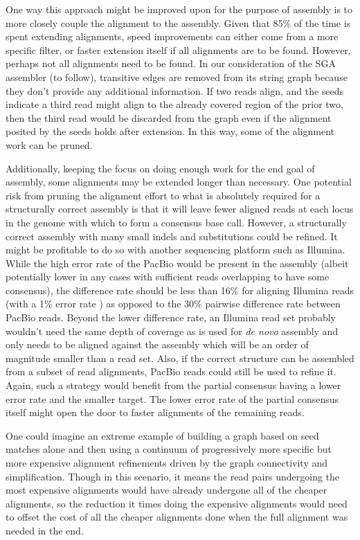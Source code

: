 One way this approach might be improved upon for the purpose of assembly is to more closely couple the alignment to the assembly.  Given that 85\% of the time is spent extending alignments, speed improvements can either come from a more specific filter, or faster extension itself if all alignments are to be found.  However, perhaps not all alignments need to be found.  In our consideration of the SGA assembler (to follow), transitive edges are removed from its string graph because they don't provide any additional information.  If two reads align, and the seeds indicate a third read might align to the already covered region of the prior two, then the third read would be discarded from the graph even if the alignment posited by the seeds holds after extension.  In this way, some of the alignment work can be pruned.

Additionally, keeping the focus on doing enough work for the end goal of assembly, some alignments may be extended longer than necessary.  One potential risk from pruning the alignment effort to what is absolutely required for a structurally correct assembly is that it will leave fewer aligned reads at each locus in the genome with which to form a consensus base call.  However, a structurally correct assembly with many small indels and substitutions could be refined.  It might be profitable to do so with another sequencing platform such as Illumina.  While the high error rate of the PacBio would be present in the assembly (albeit potentially lower in any cases with sufficient reads overlapping to have some consensus), the difference rate should be less than 16\% for aligning Illumina reads (with a 1\% error rate \cite{quail2012tale}) as opposed to the 30\% pairwise difference rate between PacBio reads.  Beyond the lower difference rate, an Illumina read set probably wouldn't need the same depth of coverage as is used for \emph{de novo} assembly and only needs to be aligned against the assembly which will be an order of magnitude smaller than a read set.  Also, if the correct structure can be assembled from a subset of read alignments, PacBio reads could still be used to refine it.  Again, such a strategy would benefit from the partial consensus having a lower error rate and the smaller target.  The lower error rate of the partial consensus itself might open the door to faster alignments of the remaining reads.

One could imagine an extreme example of building a graph based on seed matches alone and then using a continuum of progressively more specific but more expensive alignment refinements driven by the graph connectivity and simplification.  Though in this scenario, it means the read pairs undergoing the most expensive alignments would have already undergone all of the cheaper alignments, so the reduction it times doing the expensive alignments would need to offset the cost of all the cheaper alignments done when the full alignment was needed in the end.

